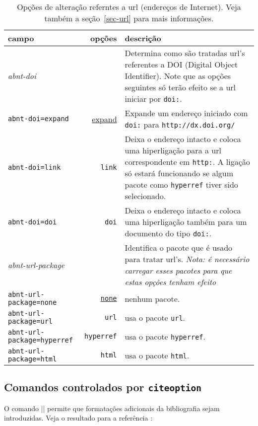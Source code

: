 \documentclass[a4paper]{ltxdoc}
\begin{document}
\begin{table}[htbp]

\caption[Opções de alteração dos estilos bibliográficos: url]{
Opções de alteração referntes a url (endereços de Internet).
Veja também a seção~\protect\ref{sec-url} para mais informações.}
\label{tabela-opcoes-url}

\begin{center}
\begin{tabular}{lrp{8cm}}\hline\hline
campo & opções & descrição \\ \hline
\emph{abnt-doi} & & Determina como são tratadas url's referentes a DOI
(Digital Object Identifier)\cite{DOI}. Note que as opções seguintes
só terão efeito se a url iniciar por {\tt doi:}.\\
{\tt abnt-doi=expand} & \underline{expand} &
Expande um endereço iniciado com {\tt doi:} para
{\tt http://dx.doi.org/}\\
{\tt abnt-doi=link} & {\tt link} & Deixa o endereço intacto e coloca uma hiperligação
para a url correspondente em {\tt http:}. A ligação só estará funcionando
se algum pacote como {\tt hyperref} tiver sido selecionado.\\
{\tt abnt-doi=doi} & {\tt doi} & Deixa o endereço intacto e coloca uma hiperligação
também para um documento do tipo {\tt doi:}.\\ \hline
\emph{abnt-url-package} & & Identifica o pacote que é usado para tratar url's.
\emph{Nota: é necessário carregar esses pacotes para que estas opções tenham
efeito}\\
{\tt abnt-url-package=none} &\underline{\tt none} & nenhum pacote.\\
{\tt abnt-url-package=url} & {\tt url} & usa o pacote {\tt url}.\\
{\tt abnt-url-package=hyperref} & {\tt hyperref} & usa o pacote {\tt hyperref}.\\
{\tt abnt-url-package=html} & {\tt html} & usa o pacote {\tt html}.\\
\hline\hline
\end{tabular}
\end{center}
\end{table}

\subsection{Comandos controlados por {\tt citeoption}}

\DescribeMacro{\bibtextitlecommand}
\label{sec-titlecommand}
O comando |\bibtextitlecommand|
permite que formatações adicionais da bibliografia sejam introduzidas. Veja o
resultado para a referência :
\end{document}
